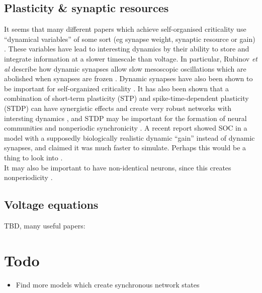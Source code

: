 \documentclass[a4paper, 12pt]{article}
\begin{document}
\subsection*{Plasticity \& synaptic resources}
It seems that many different papers which achieve self-organised criticality use ``dynamical variables'' of some sort (eg synapse weight, synaptic resource or gain) \cite{munozlg, rubinov, kinouchi}. These variables have lead to interesting dynamics by their ability to store and integrate information at a slower timescale than voltage. In particular, Rubinov \textit{et al} describe how dynamic synapses allow slow mesoscopic oscillations which are abolished when synapses are frozen \cite{rubinov}. Dynamic synapses have also been shown to be important for self-organized criticality \cite{dynamicsynapses}. It has also been shown that a combination of short-term plasticity (STP) and spike-time-dependent plasticity (STDP) can have synergistic effects and create very robust networks with intersting dynamics \cite{biologicalsoc}, and STDP may be important for the formation of neural communities and nonperiodic synchronicity \cite{heterogeneousnetwork}. A recent report showed SOC in a model with a supposedly biologically realistic dynamic ``gain'' instead of dynamic synapses, and claimed it was much faster to simulate. Perhaps this would be a thing to look into \cite{kinouchi}.\\

It may also be important to have non-identical neurons, since this creates nonperiodicity \cite{heterogeneousnetwork}.

\subsection*{Voltage equations}
TBD, many useful papers: \cite{objectworkingmemory, rubinov, kinouchi, larremorerestrepo, entropyinhibition, dynamicsynapses, biologicalsoc, heterogeneousnetwork}

\section*{Todo}
\begin{itemize}
\item Find more models which create synchronous network states
\end{itemize}



\end{document}

